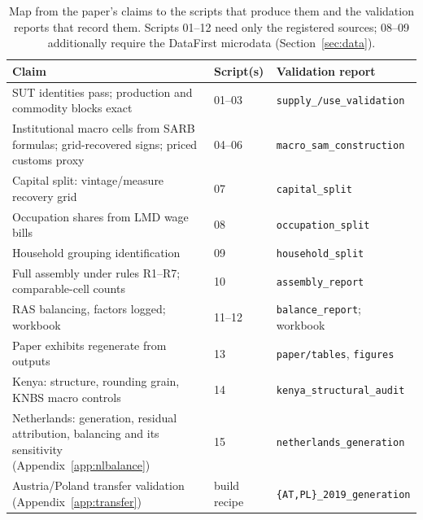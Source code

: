 \begin{table}[h]
\centering\small
\begin{tabularx}{\textwidth}{Xll}
\toprule
Claim & Script(s) & Validation report \\
\midrule
SUT identities pass; production and commodity blocks exact
  & 01--03 & \texttt{supply\_/use\_validation} \\
Institutional macro cells from SARB formulas; grid-recovered signs;
  priced customs proxy & 04--06 & \texttt{macro\_sam\_construction} \\
Capital split: vintage/measure recovery grid & 07 &
  \texttt{capital\_split} \\
Occupation shares from LMD wage bills & 08 & \texttt{occupation\_split} \\
Household grouping identification & 09 & \texttt{household\_split} \\
Full assembly under rules R1--R7; comparable-cell counts & 10 &
  \texttt{assembly\_report} \\
RAS balancing, factors logged; workbook & 11--12 &
  \texttt{balance\_report}; workbook \\
Paper exhibits regenerate from outputs & 13 & \texttt{paper/tables},
  \texttt{figures} \\
Kenya: structure, rounding grain, KNBS macro controls & 14 &
  \texttt{kenya\_structural\_audit} \\
Netherlands: generation, residual attribution, balancing and its
  sensitivity (Appendix~\ref{app:nlbalance}) & 15 &
  \texttt{netherlands\_generation} \\
Austria/Poland transfer validation (Appendix~\ref{app:transfer}) &
  build recipe & \texttt{\{AT,PL\}\_2019\_generation} \\
\bottomrule
\end{tabularx}
\caption{Map from the paper's claims to the scripts that produce them
and the validation reports that record them. Scripts 01--12 need only
the registered sources; 08--09 additionally require the DataFirst
microdata (Section~\ref{sec:data}).}
\label{tab:claimmap}
\end{table}
